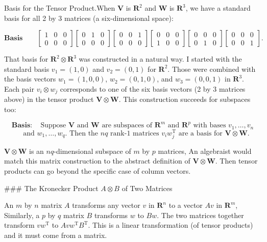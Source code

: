 Basis for the Tensor Product.When \(\mathbf{V}\) is \(\mathbf{R}^{2}\) and \(\mathbf{W}\) is \(\mathbf{R}^{3}\), we have a standard basis for all 2 by 3 matrices (a six-dimensional space):

\[\mathbf{Basis}\qquad\begin{bmatrix}1&0&0\\ 0&0&0\end{bmatrix}\begin{bmatrix}0&1&0\\ 0&0&0\end{bmatrix}\begin{bmatrix}0&0&1\\ 0&0&0\end{bmatrix}\begin{bmatrix}0&0&0\\ 1&0&0\end{bmatrix}\begin{bmatrix}0&0&0\\ 0&1&0\end{bmatrix}\begin{bmatrix}0&0&0\\ 0&0&1\end{bmatrix}.\]

That basis for \(\mathbf{R}^{2}\otimes\mathbf{R}^{3}\) was constructed in a natural way. I started with the standard basis \(v_{1}=(1,0)\) and \(v_{2}=(0,1)\) for \(\mathbf{R}^{2}\). Those were combined with the basis vectors \(w_{1}=(1,0,0)\), \(w_{2}=(0,1,0)\), and \(w_{3}=(0,0,1)\) in \(\mathbf{R}^{3}\). Each pair \(v_{i}\otimes w_{j}\) corresponds to one of the six basis vectors (2 by 3 matrices above) in the tensor product \(\mathbf{V}\otimes\mathbf{W}\). This construction succeeds for subspaces too:

\[\mathbf{Basis}:\quad\text{Suppose $\mathbf{V}$ and $\mathbf{W}$ are subspaces of $\mathbf{R}^{m}$ and $\mathbf{R}^{p}$ with bases $v_{1},\ldots,v_{n}$}\] \[\quad\text{and $w_{1},\ldots,w_{q}$. Then the $nq$ rank-1 matrices $v_{i}w_{j}^{\mathrm{T}}$ are a basis for $\mathbf{V}\otimes\mathbf{W}$.}\]

\(\mathbf{V}\otimes\mathbf{W}\) is an \(nq\)-dimensional subspace of \(m\) by \(p\) matrices, An algebraist would match this matrix construction to the abstract definition of \(\mathbf{V}\otimes\mathbf{W}\). Then tensor products can go beyond the specific case of column vectors.

### The Kronecker Product \(A\otimes B\) of Two Matrices

An \(m\) by \(n\) matrix \(A\) transforms any vector \(v\) in \(\mathbf{R}^{n}\) to a vector \(Av\) in \(\mathbf{R}^{m}\), Similarly, a \(p\) by \(q\) matrix \(B\) transforms \(w\) to \(Bw\). The two matrices together transform \(vw^{\mathrm{T}}\) to \(Avw^{\mathrm{T}}B^{\mathrm{T}}\). This is a linear transformation (of tensor products) and it must come from a matrix.

